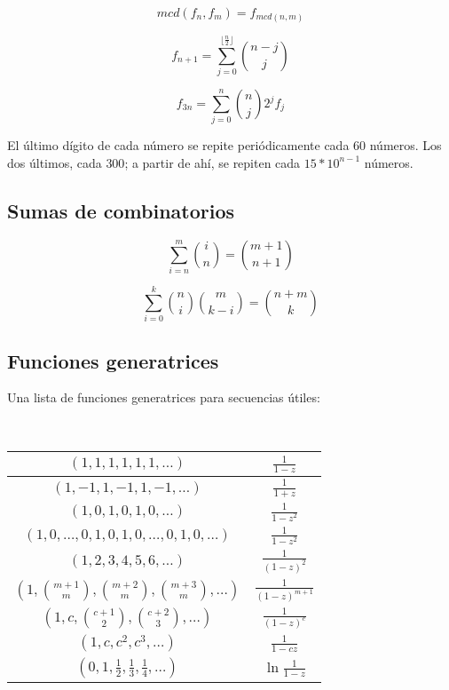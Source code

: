 \begin{equation*}
  mcd(f_n, f_m) = f_{mcd(n, m)}
\end{equation*}

\begin{equation*}
   f_{n+1} = \sum_{j = 0}^{\lfloor \frac{n}{2} \rfloor} \binom{n-j}{j}
\end{equation*}

\begin{equation*}
f_{3n} = \sum_{j = 0}^{n} \binom{n}{j} 2^j f_j
\end{equation*}

El último dígito de cada número se repite periódicamente cada $60$ números. Los dos últimos, cada $300$; a partir de ahí, se repiten cada $15*10^{n-1}$ números.

\subsection{Sumas de combinatorios}

\begin{equation*}
\sum_{i = n}^m \binom{i}{n} = \binom{m + 1}{n + 1}
\end{equation*}

\begin{equation*}
\sum_{i = 0}^k \binom{n}{i} \binom{m}{k - i} = \binom{n + m}{k}
\end{equation*}


\subsection{Funciones generatrices}
Una lista de funciones generatrices para secuencias útiles:

\ 

\begin{tabular}{|c|c|}
  \hline
  $(1,1,1,1,1,1,\ldots)$ & $\frac{1}{1-z}$ \\ \hline
  $(1,-1,1,-1,1,-1,\ldots)$ & $\frac{1}{1+z}$ \\ \hline
  $(1,0,1,0,1,0,\ldots)$ & $\frac{1}{1-z^2}$ \\ \hline
  $(1,0,\ldots,0,1,0,1,0,\ldots,0,1,0,\ldots)$ & $\frac{1}{1-z^2}$ \\ \hline
  $(1,2,3,4,5,6,\ldots)$ & $\frac{1}{(1-z)^2}$ \\ \hline
  $(1,\binom{m+1}{m},\binom{m+2}{m},\binom{m+3}{m},\ldots)$ & $\frac{1}{(1-z)^{m+1}}$ \\ \hline
  $(1,c,\binom{c+1}{2},\binom{c+2}{3},\ldots)$ & $\frac{1}{(1-z)^c}$ \\ \hline
  $(1,c,c^2, c^3, \ldots)$ & $\frac{1}{1-cz}$ \\ \hline
  $(0,1,\frac{1}{2},\frac{1}{3},\frac{1}{4},\ldots)$ & $\ln \frac{1}{1-z}$ \\ \hline
\end{tabular}

